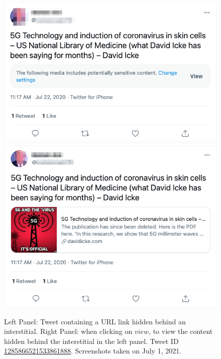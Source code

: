 \documentclass{article}
\begin{document}
\begin{figure}[h]
	\centering
		\includegraphics[scale=0.35]{./img/tweets/Capture_2021-07-01_2.png} 
		\includegraphics[scale=0.35]{./img/tweets/Capture_2021-07-01.png}
	\caption{Left Panel: Tweet containing a URL link hidden behind an interstitial. Right Panel: when clicking on $view$, to view the content hidden behind the interstitial in the left panel. Tweet ID \href{https://twitter.com/mohsinmalvi19/status/1285866521533861888}{1285866521533861888}. Screenshots taken on July 1, 2021. }
	\label{fig_notice}
\end{figure}
\end{document}
